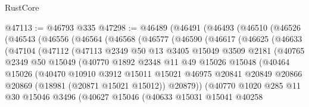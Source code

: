 \begin{lexlean}{RustCore}
\begin{coremodule}
@47113 := @46793 @335
@47298 := @46489
    (@46491
      (@46493
        (@46510
          (@46526
            (@46543
              (@46556
                (@46564
                  (@46568
                    (@46577
                      (@46590
                        (@46617
                          (@46625
                            (@46633
                              (@47104
                                (@47112
                                  (@47113
                                    @2349
                                    @50
                                    @13
                                    @3405
                                    @15049
                                    @3509
                                    @2181
                                    (@40765
                                      @2349
                                      @50
                                      @15049
                                      (@40770
                                        @1892
                                        @2348
                                        @11
                                        @49
                                        @15026
                                        @15048
                                        (@40464
                                          @15026
                                          (@40470
                                            @10910
                                            @3912
                                            @15011
                                            @15021
                                            @46975
                                            @20841
                                            @20849
                                            @20866
                                            @20869
                                            (@18981 (@20871 @15021 @15012))
                                            @20879))
                                        (@40770
                                          @1020
                                          @285
                                          @11
                                          @30
                                          @15046
                                          @3496
                                          (@40627
                                            @15046
                                            (@40633
                                              @15031
                                              @15041
                                              @40258

\end{coremodule}
\end{lexlean}
